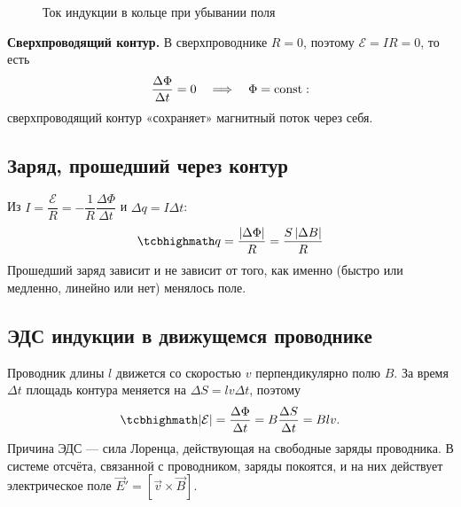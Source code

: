\documentclass[11pt,a4paper]{article}
\newcommand{\Ei}{\mathcal{E}}
\newcommand{\odotB}[1]{\node[circle,draw,inner sep=1.1pt,line width=0.5pt] at #1 {}; \fill #1 circle (0.6pt);}
\begin{document}
\begin{figure}[H]
\centering
{}
\caption{Ток индукции в кольце при убывании поля}
\end{figure}

\textbf{Сверхпроводящий контур.} В сверхпроводнике $R=0$, поэтому $\Ei=IR=0$, то есть
\[
\frac{\Delta\Phi}{\Delta t}=0\quad\Longrightarrow\quad\Phi=\mathrm{const}:
\]
сверхпроводящий контур «сохраняет» магнитный поток через себя.

\subsection{Заряд, прошедший через контур}
Из $I=\dfrac{\Ei}R=-\dfrac1R\dfrac{\Delta\Phi}{\Delta t}$ и $\Delta q=I\Delta t$:
\[
\kbox{q=\frac{|\Delta\Phi|}R=\frac{S\,|\Delta B|}R}
\]
Прошедший заряд зависит  и не зависит от того, как именно (быстро или медленно, линейно или нет)
менялось поле.

\subsection{ЭДС индукции в движущемся проводнике}
Проводник длины $l$ движется со скоростью $v$ перпендикулярно полю $B$. За время $\Delta t$ площадь контура меняется на $\Delta S=lv\Delta t$, поэтому
\[
\kbox{|\Ei|=\frac{\Delta\Phi}{\Delta t}=B\frac{\Delta S}{\Delta t}=Blv.}
\]
Причина ЭДС — сила Лоренца, действующая на свободные заряды проводника. В системе отсчёта, связанной с проводником, заряды покоятся,
и на них действует электрическое поле $\vec E'=[\vec v\times\vec B]$.
\end{document}
